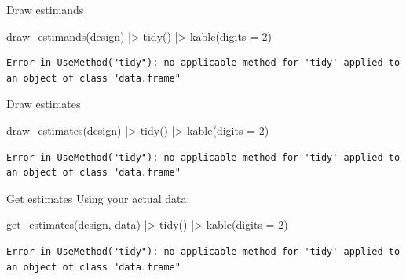 \documentclass[
  11pt,
  ignorenonframetext,
]{beamer}
\newenvironment{Shaded}{\begin{snugshade}}{\end{snugshade}}
\newcommand{\AttributeTok}[1]{\textcolor[rgb]{0.40,0.45,0.13}{#1}}
\newcommand{\DecValTok}[1]{\textcolor[rgb]{0.68,0.00,0.00}{#1}}
\newcommand{\FunctionTok}[1]{\textcolor[rgb]{0.28,0.35,0.67}{#1}}
\newcommand{\NormalTok}[1]{\textcolor[rgb]{0.00,0.23,0.31}{#1}}
\newcommand{\SpecialCharTok}[1]{\textcolor[rgb]{0.37,0.37,0.37}{#1}}
\begin{document}
\begin{frame}[fragile]{Draw estimands}
\protect\hypertarget{draw-estimands}{}
\begin{Shaded}
\begin{Highlighting}[]
\FunctionTok{draw\_estimands}\NormalTok{(design) }\SpecialCharTok{|\textgreater{}}
  \FunctionTok{tidy}\NormalTok{() }\SpecialCharTok{|\textgreater{}}
  \FunctionTok{kable}\NormalTok{(}\AttributeTok{digits =} \DecValTok{2}\NormalTok{)}
\end{Highlighting}
\end{Shaded}

\begin{verbatim}
Error in UseMethod("tidy"): no applicable method for 'tidy' applied to an object of class "data.frame"
\end{verbatim}
\end{frame}

\begin{frame}[fragile]{Draw estimates}
\protect\hypertarget{draw-estimates}{}
\begin{Shaded}
\begin{Highlighting}[]
\FunctionTok{draw\_estimates}\NormalTok{(design) }\SpecialCharTok{|\textgreater{}} 
  \FunctionTok{tidy}\NormalTok{() }\SpecialCharTok{|\textgreater{}}
  \FunctionTok{kable}\NormalTok{(}\AttributeTok{digits =} \DecValTok{2}\NormalTok{)}
\end{Highlighting}
\end{Shaded}

\begin{verbatim}
Error in UseMethod("tidy"): no applicable method for 'tidy' applied to an object of class "data.frame"
\end{verbatim}
\end{frame}

\begin{frame}[fragile]{Get estimates}
\protect\hypertarget{get-estimates}{}
Using your actual data:

\begin{Shaded}
\begin{Highlighting}[]
\FunctionTok{get\_estimates}\NormalTok{(design, data) }\SpecialCharTok{|\textgreater{}}
  \FunctionTok{tidy}\NormalTok{() }\SpecialCharTok{|\textgreater{}}
  \FunctionTok{kable}\NormalTok{(}\AttributeTok{digits =} \DecValTok{2}\NormalTok{)}
\end{Highlighting}
\end{Shaded}

\begin{verbatim}
Error in UseMethod("tidy"): no applicable method for 'tidy' applied to an object of class "data.frame"
\end{verbatim}
\end{frame}
\end{document}
